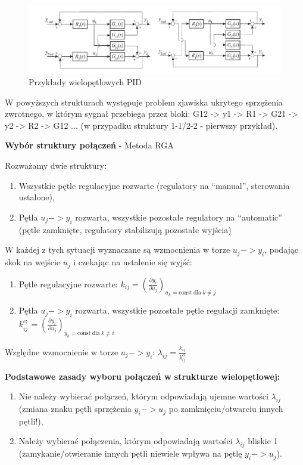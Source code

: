 \begin{figure}[H]
\centering
\includegraphics[width=\linewidth]{fig/Przykłady wielopętlowych PID.png}
\caption{Przykłady wielopętlowych PID}
\end{figure}

W powyższych strukturach występuje problem zjawiska ukrytego sprzężenia zwrotnego, w którym sygnał przebiega przez bloki: G12 -> y1 -> R1 -> G21 -> y2 -> R2 -> G12 ... (w przypadku struktury 1-1/2-2 - pierwszy przykład).

\textbf{Wybór struktury połączeń} - Metoda RGA

Rozważamy dwie struktury:
\begin{enumerate}
    \item Wszystkie pętle regulacyjne rozwarte (regulatory na ``manual'', sterowania ustalone),
    \item Pętla $u_j -> y_i$ rozwarta, wszystkie pozostałe regulatory na ``automatic'' (pętle zamknięte, regulatory stabilizują pozostałe wyjścia)
\end{enumerate}

W każdej z tych sytuacji wyznaczane są wzmocnienia w torze $u_j -> y_i$, podając skok na wejście $u_j$ i czekając na ustalenie się wyjść:
\begin{enumerate}
    \item Pętle regulacyjne rozwarte:\mbox{}
    $k_{ij} = \left(\frac{\partial y_i}{\partial u_j}\right)_{u_k=\mathrm{const}\:\mathrm{dla}\: k\neq j}$
    \item Pętla $u_j->y_i$ rozwarta, wszystkie pozostałe pętle regulacji zamknięte:\mbox{}
    $k_{ij}^{c;} = \left(\frac{\partial y_i}{\partial u_j}\right)_{y_k=\mathrm{const}\:\mathrm{dla}\: k\neq i}$
\end{enumerate}

Względne wzmocnienie w torze $u_j->y_i$:\mbox{}
$\lambda_{ij} = \frac{k_{ij}}{k_{ij}^{cl}}$

\textbf{Podstawowe zasady wyboru połączeń w strukturze wielopętlowej:}
\begin{enumerate}
    \item Nie należy wybierać połączeń, którym odpowiadają ujemne wartości $\lambda_{ij}$ (zmiana znaku pętli sprzężenia $y_i->u_j$ po zamknięciu/otwarciu innych pętli!),
    \item Należy wybierać połączenia, którym odpowiadają wartości $\lambda_{ij}$ bliskie 1 (zamykanie/otwieranie innych pętli niewiele wpływa na pętlę $y_i->u_j$). 
\end{enumerate}

